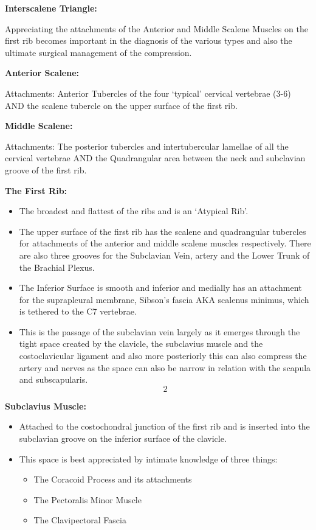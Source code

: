\documentclass[
]{book}
\begin{document}
\textbf{Interscalene Triangle:}

Appreciating the attachments of the Anterior and Middle Scalene Muscles
on the first rib becomes important in the diagnosis of the various types
and also the ultimate surgical management of the compression.

\textbf{Anterior Scalene:}

Attachments: Anterior Tubercles of the four `typical' cervical vertebrae
(3-6) AND the scalene tubercle on the upper surface of the first rib.

\textbf{Middle Scalene:}

Attachments: The posterior tubercles and intertubercular lamellae of all
the cervical vertebrae AND the Quadrangular area between the neck and
subclavian groove of the first rib. \citet{mcminnLastAnatomyRegional2019}

\textbf{The First Rib:}~

\begin{itemize}
\item
  The broadest and flattest of the ribs and is an `Atypical Rib'.~
\item
  The upper surface of the first rib has the scalene and quadrangular
  tubercles for attachments of the anterior and middle scalene muscles
  respectively. There are also three grooves for the Subclavian Vein,
  artery and the Lower Trunk of the Brachial Plexus.~
\item
  The Inferior Surface is smooth and inferior and medially has an
  attachment for the suprapleural membrane, Sibson's fascia AKA
  scalenus minimus, which is tethered to the C7 vertebrae.~
\item
  This is the passage of the subclavian vein largely as it emerges
  through the tight space created by the clavicle, the subclavius
  muscle and the costoclavicular ligament and also more posteriorly
  this can also compress the artery and nerves as the space can also
  be narrow in relation with the scapula and subscapularis. \[2\]
\end{itemize}

\textbf{Subclavius Muscle:}

\begin{itemize}
\item
  Attached to the costochondral junction of the first rib and is
  inserted into the subclavian groove on the inferior surface of the
  clavicle. \citet{mcminnLastAnatomyRegional2019}
\item
  This space is best appreciated by intimate knowledge of three
  things:

  \begin{itemize}
  \item
    The Coracoid Process and its attachments
  \item
    The Pectoralis Minor Muscle
  \item
    The Clavipectoral Fascia
  \end{itemize}
\end{itemize}
\end{document}
